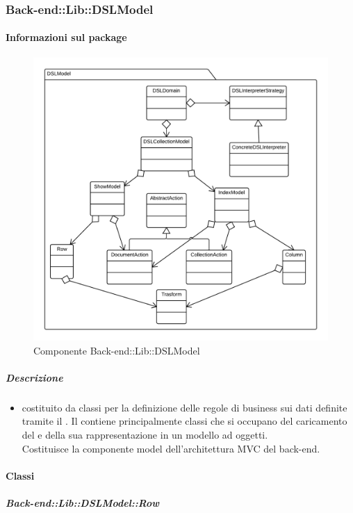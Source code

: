   \subsubsection{Back-end::Lib::DSLModel}
  \paragraph{Informazioni sul package} 
    \begin{figure}[H] 
      \begin{center} 
        \includegraphics[width=\textwidth]{packages/Back-end::Lib::DSLModel.png}  
        \caption{Componente Back-end::Lib::DSLModel}
      \end{center}  
    \end{figure} 
  \subparagraph{Descrizione} 
    \begin{itemize}
    \item[]  costituito da classi per la definizione delle regole di business sui dati definite tramite il . 
Il  contiene principalmente classi che si occupano del caricamento del  e della sua rappresentazione in un modello ad oggetti. \\
Costituisce la componente model dell'architettura MVC del back-end.
    \end{itemize} 
    \paragraph{Classi}
      \subparagraph{Back-end::Lib::DSLModel::Row}
        
